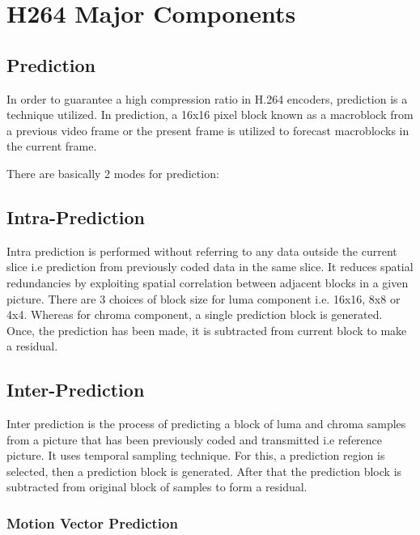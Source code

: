 \section{H264 Major Components}

\subsection{Prediction}
In order to guarantee a high compression ratio in H.264 encoders, prediction is a technique utilized. In prediction, a 16x16 pixel block known as a macroblock from a previous video frame or the present frame is utilized to forecast macroblocks in the current frame. 

There are basically 2 modes for prediction:

\subsection{Intra-Prediction}
Intra prediction is performed without referring to any data outside the current slice i.e prediction from previously coded data in the same slice. It reduces spatial redundancies by exploiting spatial correlation between adjacent blocks in a given picture. There are 3 choices of block size for luma component i.e. 16x16, 8x8 or 4x4. Whereas for chroma component, a single prediction block is generated. Once, the prediction has been made, it is subtracted from current block to make a residual. 

\subsection{Inter-Prediction}
Inter prediction is the process of predicting a block of luma and chroma samples from a picture that has been previously coded and transmitted i.e reference picture. It uses temporal sampling technique. For this, a prediction region is selected, then a prediction block is generated. After that the prediction block is subtracted from original block of samples to form a residual. 

\subsubsection{Motion Vector Prediction}



